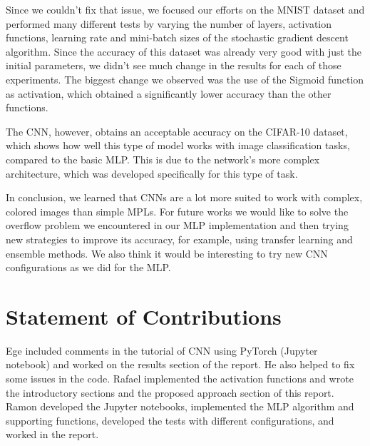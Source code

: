 \documentclass[conference]{IEEEtran}
\begin{document}
Since we couldn't fix that issue, we focused our efforts on the MNIST dataset and performed many different tests by varying the number of layers, activation functions, learning rate and mini-batch sizes of the stochastic gradient descent algorithm. Since the accuracy of this dataset was already very good with just the initial parameters, we didn't see much change in the results for each of those experiments. The biggest change we observed was the use of the Sigmoid function as activation, which obtained a significantly lower accuracy than the other functions.

The CNN, however, obtains an acceptable accuracy on the CIFAR-10 dataset, which shows how well this type of model works with image classification tasks, compared to the basic MLP. This is due to the network's more complex architecture, which was developed specifically for this type of task.

In conclusion, we learned that CNNs are a lot more suited to work with complex, colored images than simple MPLs. For future works we would like to solve the overflow problem we encountered in our MLP implementation and then trying new strategies to improve its accuracy, for example, using transfer learning and ensemble methods. We also think it would be interesting to try new CNN configurations as we did for the MLP.

\section{Statement of Contributions}
\label{section:contributions}

Ege included comments in the tutorial of CNN using PyTorch (Jupyter notebook) and worked on the results section of the report. He also helped to fix some issues in the code. Rafael implemented the activation functions and wrote the introductory sections and the proposed approach section of this report. Ramon developed the Jupyter notebooks, implemented the MLP algorithm and supporting functions, developed the tests with different configurations, and worked in the report.

\medskip

\small





\end{document}
